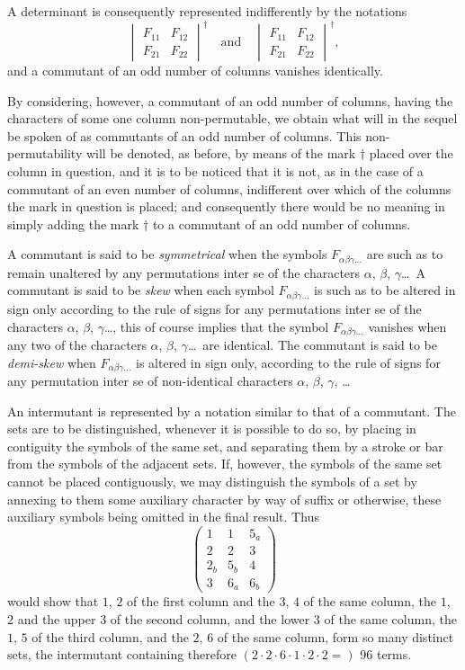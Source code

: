 \documentclass[11pt,a4paper]{article}
\theoremstyle{plain}
\begin{document}
A determinant is consequently represented indifferently by the notations
\[\begin{vmatrix} F_{11} & F_{12} \\ F_{21} & F_{22} \end{vmatrix}^{\dagger} \quad \text{and} \quad \begin{vmatrix} F_{11} & F_{12} \\ F_{21} & F_{22} \end{vmatrix}^{\dagger},\]
and a commutant of an odd number of columns vanishes identically.

By considering, however, a commutant of an odd number of columns, having the characters of some one column non-permutable, we obtain what will in the sequel be spoken of as commutants of an odd number of columns. This non-permutability will be denoted, as before, by means of the mark $\dagger$ placed over the column in question, and it is to be noticed that it is not, as in the case of a commutant of an even number of columns, indifferent over which of the columns the mark in question is placed; and consequently there would be no meaning in simply adding the mark $\dagger$ to a commutant of an odd number of columns.

A commutant is said to be \textit{symmetrical} when the symbols $F_{\alpha\beta\gamma\ldots}$ are such as to remain unaltered by any permutations inter se of the characters $\alpha$, $\beta$, $\gamma$\ldots\ A commutant is said to be \textit{skew} when each symbol $F_{\alpha\beta\gamma\ldots}$ is such as to be altered in sign only according to the rule of signs for any permutations inter se of the characters $\alpha$, $\beta$, $\gamma$\ldots, this of course implies that the symbol $F_{\alpha\beta\gamma\ldots}$ vanishes when any two of the characters $\alpha$, $\beta$, $\gamma$\ldots\ are identical. The commutant is said to be \textit{demi-skew} when $F_{\alpha\beta\gamma\ldots}$ is altered in sign only, according to the rule of signs for any permutation inter se of non-identical characters $\alpha$, $\beta$, $\gamma$, \ldots

An intermutant is represented by a notation similar to that of a commutant. The sets are to be distinguished, whenever it is possible to do so, by placing in contiguity the symbols of the same set, and separating them by a stroke or bar from the symbols of the adjacent sets. If, however, the symbols of the same set cannot be placed contiguously, we may distinguish the symbols of a set by annexing to them some auxiliary character by way of suffix or otherwise, these auxiliary symbols being omitted in the final result. Thus
\[\begin{pmatrix} 1 & 1 & 5_a \\ 2 & 2 & 3 \\ \hline 2_b & 5_b & 4 \\ 3 & 6_a & 6_b \end{pmatrix}\]
would show that $1$, $2$ of the first column and the $3$, $4$ of the same column, the $1$, $2$ and the upper $3$ of the second column, and the lower $3$ of the same column, the $1$, $5$ of the third column, and the $2$, $6$ of the same column, form so many distinct sets, the intermutant containing therefore $(2 \cdot 2 \cdot 6 \cdot 1 \cdot 2 \cdot 2 = )$ 96 terms.
\end{document}
